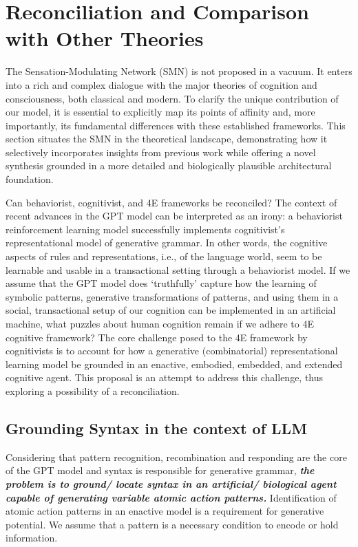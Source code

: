 \section{Reconciliation and Comparison with Other Theories}
\label{sec:comparison}
The Sensation-Modulating Network (SMN) is not proposed in a vacuum. It enters into a rich and complex dialogue with the major theories of cognition and consciousness, both classical and modern. To clarify the unique contribution of our model, it is essential to explicitly map its points of affinity and, more importantly, its fundamental differences with these established frameworks. This section situates the SMN in the theoretical landscape, demonstrating how it selectively incorporates insights from previous work while offering a novel synthesis grounded in a more detailed and biologically plausible architectural foundation.

Can behaviorist, cognitivist, and 4E frameworks be reconciled?
The context of recent advances in the GPT model can be interpreted as an irony: a behaviorist reinforcement learning model successfully implements cognitivist's representational model of generative grammar. In other words, the cognitive aspects of rules and representations, i.e., of the language world, seem to be learnable and usable in a transactional setting through a behaviorist model. If we assume that the GPT model does `truthfully' capture how the learning of symbolic patterns, generative transformations of patterns, and using them in a social, transactional setup of our cognition can be implemented in an artificial machine, what puzzles about human cognition remain if we adhere to 4E cognitive framework? The core challenge posed to the 4E framework by cognitivists is to account for how a generative (combinatorial) representational learning model be grounded in an enactive, embodied, embedded, and extended cognitive agent. This proposal is an attempt to address this challenge, thus exploring a possibility of a reconciliation.

\subsection{Grounding Syntax in the context of LLM} Considering that pattern recognition, recombination and responding are the core of the GPT model and syntax is responsible for generative grammar, \textbf{\textit{the problem is to ground/ locate syntax in an artificial/ biological agent capable of generating variable atomic action patterns. }}Identification of atomic action patterns in an enactive model is a requirement for generative potential. We assume that a pattern is a necessary condition to encode or hold information. 

